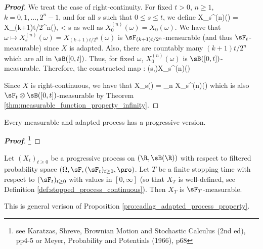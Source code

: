 \begin{proof}[\bf Proof]%
We treat the case of right-continuity. For fixed $t>0$, $n\geq 1$, $k = 0,1,\dots,2^n-1$, and for all $s$ such that $0\leq s\leq t$, we define
\be
X_s^{(n)}(\omega) = X_{(k+1)t/2^n}(\omega),\qquad {} < s \leq {}
\ee
as well as $X_0^{(n)}(\omega) = X_0(\omega)$. We have that $\omega \mapsto X_s^{(n)}(\omega) = X_{(k+1)t/2^n}(\omega)$ is $\sF_{(k+1)t/2^n}$-measurable (and thus $\sF_t$-measurable) since $X$ is adapted. Also, there are countably many $(k+1)t/2^n$ which are all in $\sB([0,t])$. Thus, for fixed $\omega$, $X_0^{(n)}(\omega)$ is $\sB([0,t])$-measurable. Therefore, the constructed map
\be
[0,t]\times \Omega: (s,\omega)\mapsto X_s^{(n)}(\omega)\qquad {}
\ee

Since $X$ is right-continuous, we have that
\be
X_s(\omega) = \lim_{n\to \infty} X_s^{(n)}(\omega)
\ee
which is also $\sF_t\otimes \sB([0,t])$-measurable by Theorem \ref{thm:measurable_function_property_infinity}.
\end{proof}

\begin{proposition}
Every measurable and adapted process has a progressive version.
\end{proposition}

\begin{proof}[\bf Proof]
\footnote{see Karatzas, Shreve, Brownian Motion and Stochastic Calculus (2nd ed), pp4-5 or Meyer, Probability and Potentials (1966), p68}
\end{proof}

\begin{theorem}
Let $(X_t)_{t\geq 0}$ be a progressive process on $(\R,\sB(\R))$ with respect to filtered probability space $(\Omega,\sF,(\sF_t)_{t\geq 0}, \pro)$. Let $T$ be a finite stopping time with respect to $(\sF_t)_{t\geq 0}$ with values in $[0,\infty]$ (so that $X_T$ is well-defined, see Definition \ref{def:stopped_process_continuous}). Then $X_T$ is $\sF_T$-measurable.
\end{theorem}

\begin{remark}
This is general verison of Proposition \ref{pro:cadlag_adapted_process_property}.
\end{remark}

